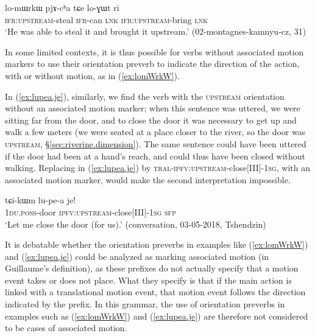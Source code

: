 \begin{exe}
\ex \label{ex:lomWrkW}
 \gll lo-mɯrkɯ pjɤ-cʰa tɕe lo-ɣɯt ri \\
 \textsc{ifr}:\textsc{upstream}-steal \textsc{ifr}-can \textsc{lnk} \textsc{ifr}:\textsc{upstream}-bring \textsc{lnk} \\
\glt `He was able to steal it and brought it upstream.' (02-montagnes-kamnyu-cz, 31)
\end{exe}

In some limited contexts, it is thus possible for verbs without associated motion markers to use their orientation preverb to indicate the direction of the action, with or without motion, as in (\ref{ex:lomWrkW}). 

In (\ref{ex:lupea.je}), similarly, we find the verb  with the \textsc{upstream} orientation without an associated motion marker; when this sentence was uttered, we were sitting far from the door, and to close the door it was necessary to get up and walk a few meters (we were seated at a place closer to the river, so the door was \textsc{upstream}, §\ref{sec:riverine.dimension}). The same sentence could have been uttered if the door had been at a hand's reach, and could thus have been closed without walking. Replacing  in (\ref{ex:lupea.je}) by  \textsc{tral}-\textsc{ipfv}:\textsc{upstream}-close[III]-\textsc{1sg}, with an associated motion marker, would make the second interpretation impossible.

\begin{exe}
\ex \label{ex:lupea.je}
\gll tɕi-kɯm lu-pe-a je! \\
\textsc{1du}.\textsc{poss}-door \textsc{ipfv}:\textsc{upstream}-close[III]-\textsc{1sg} \textsc{sfp} \\
\glt `Let me close the door (for us).' (conversation, 03-05-2018, Tshendzin)
\end{exe}

It is debatable whether the orientation preverbs in examples like (\ref{ex:lomWrkW}) and (\ref{ex:lupea.je}) could be analyzed as marking associated motion (in Guillaume's \citeyear{guillaume16am} definition), as these prefixes do not actually specify that a motion event takes or does not place. What they specify is that if the main action is linked with a translational motion event, that motion event follows the direction indicated by the prefix. In this grammar, the use of orientation preverbs in examples such as (\ref{ex:lomWrkW}) and (\ref{ex:lupea.je}) are therefore not considered to be cases of associated motion.

